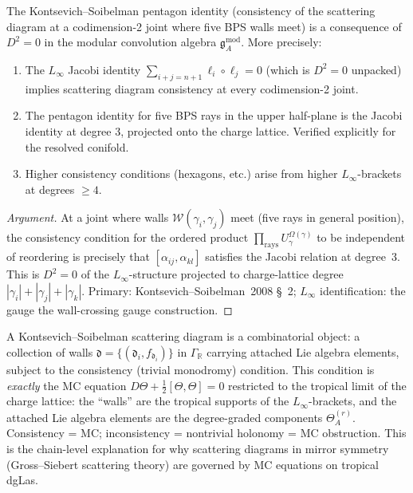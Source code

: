 \begin{theorem}[Pentagon = Jacobi at degree 3]
\label{thm:phys-pentagon-jacobi}
The Kontsevich--Soibelman pentagon identity (consistency of the scattering diagram at a codimension-2 joint where five BPS walls meet) is a consequence of $D^2 = 0$ in the modular convolution algebra $\mathfrak{g}^{\mathrm{mod}}_A$. More precisely:
\begin{enumerate}[label=\textup{(\roman*)}]
\item The $L_\infty$ Jacobi identity $\sum_{i+j=n+1} \ell_i \circ \ell_j = 0$ (which is $D^2 = 0$ unpacked) implies scattering diagram consistency at every codimension-2 joint.
\item The pentagon identity for five BPS rays in the upper half-plane is the Jacobi identity at degree $3$, projected onto the charge lattice. Verified explicitly for the resolved conifold.
\item Higher consistency conditions (hexagons, etc.) arise from higher $L_\infty$-brackets at degrees $\geq 4$.
\end{enumerate}
\end{theorem}

\begin{proof}[Argument]
At a joint where walls $\mathcal{W}(\gamma_i, \gamma_j)$ meet (five rays in general position), the consistency condition for the ordered product $\prod_{\text{rays}} U_\gamma^{\Omega(\gamma)}$ to be independent of reordering is precisely that $[\alpha_{ij}, \alpha_{kl}]$ satisfies the Jacobi relation at degree~3. This is $D^2 = 0$ of the $L_\infty$-structure projected to charge-lattice degree $|\gamma_i| + |\gamma_j| + |\gamma_k|$. Primary: Kontsevich--Soibelman~2008 \S~2; $L_\infty$ identification: the gauge the wall-crossing gauge construction.
\end{proof}

\begin{remark}
\label{rem:phys-scattering-tropical}
A Kontsevich--Soibelman scattering diagram is a combinatorial object: a collection of walls $\mathfrak{d} = \{(\mathfrak{d}_i, f_{\mathfrak{d}_i})\}$ in $\Gamma_\mathbb{R}$ carrying attached Lie algebra elements, subject to the consistency (trivial monodromy) condition. This condition is \emph{exactly} the MC equation $D\Theta + \frac{1}{2}[\Theta, \Theta] = 0$ restricted to the tropical limit of the charge lattice: the ``walls'' are the tropical supports of the $L_\infty$-brackets, and the attached Lie algebra elements are the degree-graded components $\Theta^{(r)}_A$. Consistency = MC; inconsistency = nontrivial holonomy = MC obstruction. This is the chain-level explanation for why scattering diagrams in mirror symmetry (Gross--Siebert scattering theory) are governed by MC equations on tropical dgLas.
\end{remark}

